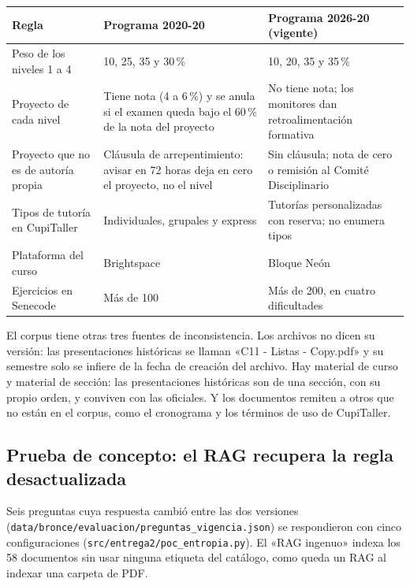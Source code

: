 \documentclass[11pt,letterpaper]{article}
\newcommand{\cod}[1]{\texttt{\small #1}}
\begin{document}
\begin{table}[H]\small\renewcommand{\arraystretch}{1.15}
\begin{tabularx}{\textwidth}{>{\raggedright\arraybackslash}p{}LL}
\toprule
\textbf{Regla} & \textbf{Programa 2020-20} & \textbf{Programa 2026-20 (vigente)} \\
\midrule
Peso de los niveles 1 a 4 & 10, 25, 35 y 30\,\% & 10, 20, 35 y 35\,\% \\
Proyecto de cada nivel & Tiene nota (4 a 6\,\%) y se anula si el examen queda bajo el 60\,\% de la nota del proyecto & No tiene nota; los monitores dan retroalimentación formativa \\
Proyecto que no es de autoría propia & Cláusula de arrepentimiento: avisar en 72 horas deja en cero el proyecto, no el nivel & Sin cláusula; nota de cero o remisión al Comité Disciplinario \\
Tipos de tutoría en CupiTaller & Individuales, grupales y express & Tutorías personalizadas con reserva; no enumera tipos \\
Plataforma del curso & Brightspace & Bloque Neón \\
Ejercicios en Senecode & Más de 100 & Más de 200, en cuatro dificultades \\
\bottomrule
\end{tabularx}
\end{table}

El corpus tiene otras tres fuentes de inconsistencia. Los archivos no dicen su versión: las presentaciones históricas se llaman «C11 - Listas - Copy.pdf» y su semestre solo se infiere de la fecha de creación del archivo. Hay material de curso y material de sección: las presentaciones históricas son de una sección, con su propio orden, y conviven con las oficiales. Y los documentos remiten a otros que no están en el corpus, como el cronograma y los términos de uso de CupiTaller.

\subsection{Prueba de concepto: el RAG recupera la regla desactualizada}
\label{sec:poc}

Seis preguntas cuya respuesta cambió entre las dos versiones (\cod{data/\allowbreak{}bronce/\allowbreak{}evaluacion/\allowbreak{}preguntas\_\allowbreak{}vigencia.json}) se respondieron con cinco configuraciones (\cod{src/\allowbreak{}entrega2/\allowbreak{}poc\_entropia.py}). El «RAG ingenuo» indexa los 58 documentos sin usar ninguna etiqueta del catálogo, como queda un RAG al indexar una carpeta de PDF.
\end{document}
